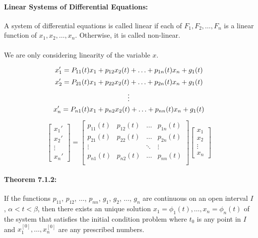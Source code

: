 \documentclass{article}
\begin{document}
\paragraph{Linear Systems of Differential Equations:} A system of differential equations is called linear if each of $F_1, F_2, \ldots, F_n$ is a
linear function of $x_1, x_2, \ldots, x_n$. Otherwise, it is called non-linear.

\paragraph{} We are only considering linearity of the variable $x$.

\[
    x_{1}' = P_{11}(t)x_1 + p_{12}x_2(t) + \ldots + p_{1n}(t) x_n + g_1(t)\\
\]
\[
    x_{2}' = P_{21}(t)x_1 + p_{22}x_2(t) + \ldots + p_{2n}(t) x_n + g_1(t)\\
\]
\[
    \vdots\\
    \]
    \[
    x_{n}' = P_{n1}(t)x_1 + p_{n2}x_2(t) + \ldots + p_{nn}(t) x_n + g_1(t)\\
\]

\[
\begin{bmatrix}
    x_1' \\
    x_2' \\
    \vdots \\
    x_n'
\end{bmatrix}
=
\begin{bmatrix}
    p_{11}(t) & p_{12}(t) & \ldots & p_{1n}(t) \\
    p_{21}(t) & p_{22}(t) & \ldots & p_{2n}(t) \\
    \vdots &  & \ddots & \vdots \\ 
    p_{n1}(t) & p_{n2}(t) & \ldots & p_{nn}(t) \\
\end{bmatrix}
\begin{bmatrix}
    x_1 \\
    x_2 \\
    \vdots \\
    x_n
\end{bmatrix}
\]

\paragraph{Theorem 7.1.2:} If the functions $p_{11}$, $p_{12}$, $\ldots$, $p_{nn}$, $g_1$, $g_2$, $\ldots$,
$g_n$ are continuous on an open interval $I$, $\alpha < t < \beta$, then there exists an unique solution
$x_1 = \phi_1 (t), \ldots , x_n = \phi_n (t)$ of the system that satisfies the initial condition
problem where $t_0$ is any point in $I$ and $x_1^{[0]}, \ldots, x_n^{[0]}$ are any prescribed numbers.
\end{document}
